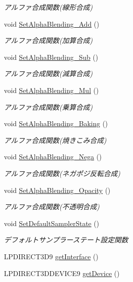 \begin{DoxyCompactItemize}
\begin{DoxyCompactList}\small\item\em アルファ合成関数(線形合成) \end{DoxyCompactList}\item 
void \mbox{\hyperlink{class_renderer_direct_x9_aa552107a3d5f8a61347fe10741fd04a3}{Set\+Alpha\+Blending\+\_\+\+Add}} ()
\begin{DoxyCompactList}\small\item\em アルファ合成関数(加算合成) \end{DoxyCompactList}\item 
void \mbox{\hyperlink{class_renderer_direct_x9_a6ddbb9f801ef6b2c86ec5cd4e97b317b}{Set\+Alpha\+Blending\+\_\+\+Sub}} ()
\begin{DoxyCompactList}\small\item\em アルファ合成関数(減算合成) \end{DoxyCompactList}\item 
void \mbox{\hyperlink{class_renderer_direct_x9_a75dbeaa680610e655c6ff202591f50d7}{Set\+Alpha\+Blending\+\_\+\+Mul}} ()
\begin{DoxyCompactList}\small\item\em アルファ合成関数(乗算合成) \end{DoxyCompactList}\item 
void \mbox{\hyperlink{class_renderer_direct_x9_a083f55d941075227189769fd9807ffd1}{Set\+Alpha\+Blending\+\_\+\+Baking}} ()
\begin{DoxyCompactList}\small\item\em アルファ合成関数(焼きこみ合成) \end{DoxyCompactList}\item 
void \mbox{\hyperlink{class_renderer_direct_x9_a5018efa829bf845405ac70beef7df947}{Set\+Alpha\+Blending\+\_\+\+Nega}} ()
\begin{DoxyCompactList}\small\item\em アルファ合成関数(ネガポジ反転合成) \end{DoxyCompactList}\item 
void \mbox{\hyperlink{class_renderer_direct_x9_a789206ba211e9cbffe0bfe4c7dfb7457}{Set\+Alpha\+Blending\+\_\+\+Opacity}} ()
\begin{DoxyCompactList}\small\item\em アルファ合成関数(不透明合成) \end{DoxyCompactList}\item 
void \mbox{\hyperlink{class_renderer_direct_x9_a229cd266427d96486c43d2e63300e438}{Set\+Default\+Sampler\+State}} ()
\begin{DoxyCompactList}\small\item\em デフォルトサンプラーステート設定関数 \end{DoxyCompactList}\item 
L\+P\+D\+I\+R\+E\+C\+T3\+D9 \mbox{\hyperlink{class_renderer_direct_x9_a9fb0abfa35b22ff87306aff6a641d220}{get\+Interface}} ()
\item 
L\+P\+D\+I\+R\+E\+C\+T3\+D\+D\+E\+V\+I\+C\+E9 \mbox{\hyperlink{class_renderer_direct_x9_a99129e2efa68d4d8b6e5d0dd6b400b70}{get\+Device}} ()
\end{DoxyCompactItemize}
